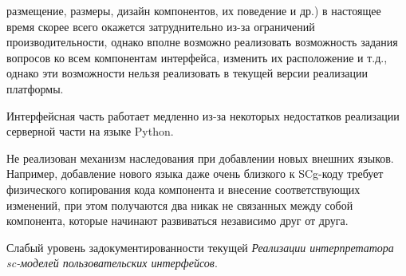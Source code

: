 \begin{scnitemize}
    размещение, размеры, дизайн компонентов, их поведение и др.) в настоящее время скорее всего окажется затруднительно
    из-за ограничений производительности, однако вполне возможно реализовать возможность задания вопросов ко всем
    компонентам интерфейса, изменить их расположение и т.д., однако эти возможности нельзя реализовать в текущей
    версии реализации платформы.
    \item Интерфейсная часть работает медленно из-за некоторых недостатков реализации серверной части на языке Python.
    \item Не реализован механизм наследования при добавлении новых внешних языков. Например, добавление нового языка
    даже очень близкого к SCg-коду требует физического копирования кода компонента и внесение соответствующих изменений,
    при этом получаются два никак не связанных между собой компонента, которые начинают развиваться независимо друг от
    друга.
    \item Слабый уровень задокументированности текущей \textit{Реализации интерпретатора sc-моделей пользовательских
    интерфейсов}.
\end{scnitemize}

